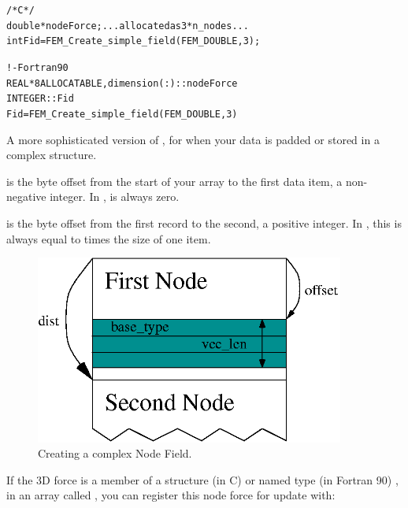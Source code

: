 \documentclass[10pt]{article}
\begin{document}
\begin{alltt}
          /* C */
          double *nodeForce; ... allocated as 3*n_nodes...
          int Fid=FEM_Create_simple_field(FEM_DOUBLE,3);
 
          ! - Fortran90
          REAL*8 ALLOCATABLE, dimension(:) :: nodeForce
          INTEGER :: Fid
          Fid=FEM_Create_simple_field(FEM_DOUBLE,3)
\end{alltt}




     A more sophisticated version of , for 
when your data is padded or stored in a complex structure.

      is the byte offset from the start of your array to the
first data item, a non-negative integer.  In ,
 is always zero.

      is the byte offset from the first record to the
second, a positive integer.  In , this is
always equal to  times the size of one item.

\begin{figure}[h]
\begin{center}
\includegraphics[width=4in]{create_field}
\end{center}
\caption{Creating a complex Node Field.}
\label{fig:createfield}
\end{figure}


If the 3D force is a member  of a structure (in C) or named type
(in Fortran 90) , in an array called , you can
register this node force for update with:
\end{document}
